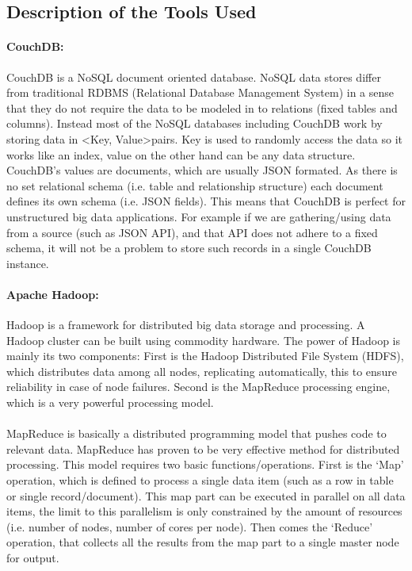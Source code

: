 \documentclass[12pt]{report}
\theoremstyle{named}
\begin{document}
\subsection{Description of the Tools Used}

\paragraph{CouchDB:\\}
CouchDB is a NoSQL document oriented database. NoSQL data stores differ from traditional RDBMS (Relational Database Management System) in a sense that they do not require the data to be modeled in to relations (fixed tables and columns). Instead most of the NoSQL databases including CouchDB work by storing data in \textless Key, Value\textgreater pairs. Key is used to randomly access the data so it works like an index, value on the other hand can be any data structure. CouchDB's values are documents, which are usually JSON formated. As there is no set relational schema (i.e. table and relationship structure) each document defines its own schema (i.e. JSON fields). This means that CouchDB is perfect for unstructured big data applications. For example if we are gathering/using data from a source (such as JSON API), and that API does not adhere to a fixed schema, it will not be a problem to store such records in a single CouchDB instance.

\paragraph{Apache Hadoop:\\}
Hadoop is a framework for distributed big data storage and processing. A Hadoop cluster can be built using commodity hardware. The power of Hadoop is mainly its two components: First is the Hadoop Distributed File System (HDFS), which distributes data among all nodes, replicating automatically, this to ensure reliability in case of node failures. Second is the MapReduce processing engine, which is a very powerful processing model.
\paragraph{}
MapReduce is basically a distributed programming model that pushes code to relevant data. MapReduce has proven to be very effective method for distributed processing. This model requires two basic functions/operations. First is the `Map' operation, which is defined to process a single data item (such as a row in table or single record/document). This map part can be executed in parallel on all data items, the limit to this parallelism is only constrained by the amount of resources (i.e. number of nodes, number of cores per node). Then comes the `Reduce' operation, that collects all the results from the map part to a single master node for output. 
\end{document}
